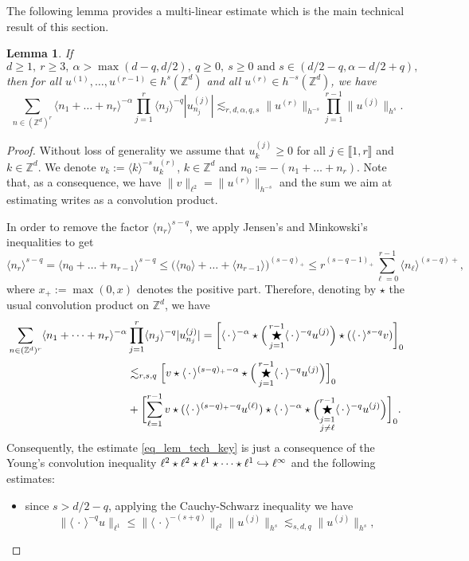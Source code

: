 \documentclass[JEP,XML,SOM,Unicode,NoEqCountersInSection,published]{cedram}
\newcommand\hto{\mathrel{\lhook\joinrel\to}}
\newtheorem{lemma}[theorem]{Lemma}
\theoremstyle{definition}
\begin{document}
The following lemma provides a multi-linear estimate which is the main technical result of this section.
\begin{lemma} \label{lem_tech_key} If
\[
d\geq 1,\ r\geq 3,\ \alpha >\max(d-q,d/2),\ q\geq 0,\ s\geq 0\text{ and }s \in (d/2-q, \alpha-d/2+q),
\]
then for all $u^{(1)},\dots, u^{(r-1)} \in h^s(\mathbb{Z}^d)$ and all $u^{(r)} \in h^{-s}(\mathbb{Z}^d)$, we have
\begin{equation}
\label{eq_lem_tech_key}
\sum_{n\in (\mathbb{Z}^d)^r} \langle n_1 + \dots + n_r \rangle^{-\alpha} \prod_{j=1}^r \langle n_j \rangle^{-q} |u^{(j)}_{n_j}| \lesssim_{r,d,\alpha,q,s} \| u^{(r)} \|_{h^{-s}} \prod_{j=1}^{r-1}\| u^{(j)} \|_{h^{s}}.
\end{equation}
\end{lemma}
\begin{proof}Without loss of generality we assume that $u^{(j)}_k \geq 0$ for all $j\in \llbracket 1,r \rrbracket$ and $k\in \mathbb{Z}^d$. We denote $v_k:= \langle k\rangle^{-s} u^{(r)}_k$, $k\in \mathbb{Z}^d$ and $n_{0}:= -(n_1+\dots+n_r)$. Note that, as a consequence, we have $\|v\|_{\ell^2} = \| u^{(r)}\|_{h^{-s}}$ and the sum we aim at estimating writes as a convolution product.

In order to remove the factor $\langle n_r \rangle^{s-q}$, we apply Jensen's and Minkowski's inequalities to get
\[
\langle n_r \rangle^{s-q} = \langle n_0 + \dots + n_{r-1} \rangle^{s-q} \leq \big(\langle n_0 \rangle+ \dots + \langle n_{r-1} \rangle \big) ^{(s-q)_+} \leq r^{(s-q-1)_+} \sum_{\ell =0}^{r-1} \langle n_{\ell} \rangle^{(s-q)+},
\]
where $x_+:= \max(0,x)$ denotes the positive part. Therefore, denoting by $\star$ the usual convolution product on $\mathbb{Z}^d$, we have
\begin{align*}
\sum_{n\in (\mathbb{Z}^d)^r} \langle n_1 + \dots + n_r \rangle^{-\alpha}& \prod_{j=1}^r \langle n_j \rangle^{-q} |u^{(j)}_{n_j}| = \biggl[\langle \, \cdot \, \rangle^{-\alpha} \star \Big(\mathop{\bigstar}_{j=1}^{r-1} \langle \, \cdot \, \rangle^{-q} u^{(j)} \Big) \star (\langle \, \cdot \, \rangle^{s-q} v)\biggr]_0 \\
&\lesssim_{r,s,q} \Bigl[v\star \langle \, \cdot \, \rangle^{(s-q)_+-\alpha} \star \Big(\mathop{\bigstar}_{j=1}^{r-1} \langle \, \cdot \, \rangle^{-q} u^{(j)} \Big)\Bigl]_0 \\
& + \biggl[\sum_{\ell=1}^{r-1} v\star (\langle \, \cdot\,\rangle^{(s-q)_+-q} u^{(\ell)}) \star \langle \, \cdot \, \rangle^{-\alpha} \star \Bigl(\mathop{\bigstar}_{\substack{j=1 \\ j\neq \ell}}^{r-1} \langle \, \cdot \, \rangle^{-q} u^{(j)} \Bigr) \biggr]_0.
\end{align*}
Consequently, the estimate \eqref{eq_lem_tech_key} is just a consequence of the Young's convolution inequality $\ell^2 \star \ell^2 \star \ell^1 \star \dots \star \ell^1 \hto \ell^\infty$ and the following estimates:
\begin{itemize}
\item
since $s > d/2-q$, applying the Cauchy-Schwarz inequality we have
\[
\| \langle \, \cdot \, \rangle^{-q} u \|_{\ell^1} \leq \| \langle \, \cdot \, \rangle^{-(s+q)} \|_{\ell^2} \| u^{(j)} \|_{h^s}\lesssim_{s,d,q}\| u^{(j)} \|_{h^s},
\]


\end{itemize}
\end{proof}
\end{document}
